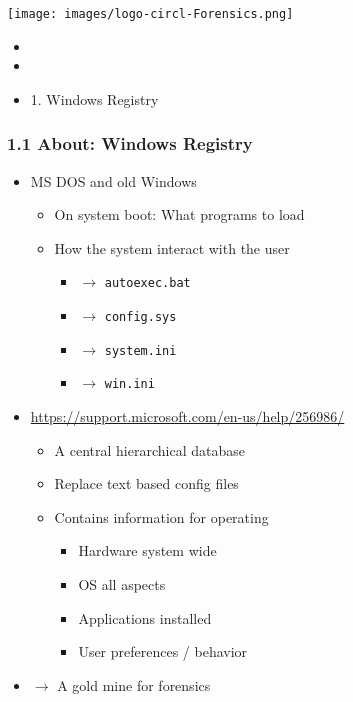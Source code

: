 %
%



\begin{frame}
    \texttt{[image: images/logo-circl-Forensics.png]}
    \begin{itemize}
        \item[]
        \item[]
        \item[] 1. Windows Registry
    \end{itemize}
\end{frame}


\begin{frame}[fragile]
  \frametitle{1.1 About: Windows Registry}
    \begin{itemize}
        \item MS DOS and old Windows
            \begin{itemize}
                \item On system boot: What programs to load
                \item How the system interact with the user
                \begin{itemize}
			\item[] $\to$ \texttt{autoexec.bat}
			\item[] $\to$ \texttt{config.sys}
			\item[] $\to$ \texttt{system.ini}
			\item[] $\to$ \texttt{win.ini}
                \end{itemize}
            \end{itemize}
        \item \url{https://support.microsoft.com/en-us/help/256986/}
            \begin{itemize}
                \item A central hierarchical database
                \item Replace text based config files
                \item Contains information for operating
                \begin{itemize}
                    \item Hardware system wide
                    \item OS all aspects
                    \item Applications installed
                    \item User preferences / behavior
                \end{itemize}
            \end{itemize}
    \item[] $\to$ A gold mine for forensics
    \end{itemize}
\end{frame}


